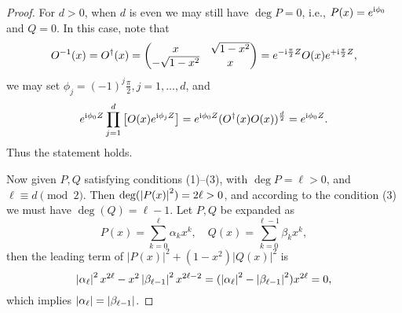 \begin{proof}
For $d>0$, when $d$ is even we may still have $\deg P=0$, i.e., $P(x)=e^{\mathrm{i} \phi_0}$ and $Q=0$. 
In this case, note that
\begin{equation}
O^{-1}(x)=O^{\dag}(x)=\begin{pmatrix}
x & \sqrt{1-x^2}\\
-\sqrt{1-x^2} & x
\end{pmatrix}=e^{-\mathrm{i}\frac{\pi}{2}Z}O(x)e^{+\mathrm{i}\frac{\pi}{2}Z},
\end{equation}
we may set $\phi_j=(-1)^{j}\frac{\pi}{2}, j=1,\ldots,d$, and 
\begin{equation}
e^{\mathrm{i} \phi_0 Z} \prod_{j=1}^{d} \left[ O(x) e^{\mathrm{i} \phi_j Z} \right]=e^{\mathrm{i} \phi_0 Z}(O^{\dag}(x)O(x))^{\frac{d}{2}}=e^{\mathrm{i} \phi_0 Z}.
\label{eqn:qsp_casezero}
\end{equation}
Thus the statement holds.

Now given $P,Q$ satisfying conditions (1)--(3), with $\deg P=\ell>0$, and $\ell\equiv d \pmod 2$. Then $\deg(\left\lvert P(x)\right\rvert^2)=2\ell>0$, and according to the condition (3) we must have $\deg(Q)=\ell-1$.
Let $P,Q$ be expanded as
\begin{equation}
P(x)=\sum_{k=0}^{\ell} \alpha_k x^k, \quad Q(x)=\sum_{k=0}^{\ell-1} \beta_k x^k,
\end{equation}
then the leading term of $|P(x)|^2 + (1-x^2) |Q(x)|^2 $ is
\begin{equation}
\left\lvert\alpha_\ell\right\rvert^2x^{2\ell}-x^2 \left\lvert\beta_{\ell-1}\right\rvert^2 x^{2\ell-2}=(\left\lvert\alpha_\ell\right\rvert^2-\left\lvert\beta_{\ell-1}\right\rvert^2)x^{2\ell}=0,
\end{equation}
which implies $\left\lvert\alpha_{\ell}\right\rvert=\left\lvert\beta_{\ell-1}\right\rvert$.


\end{proof}
